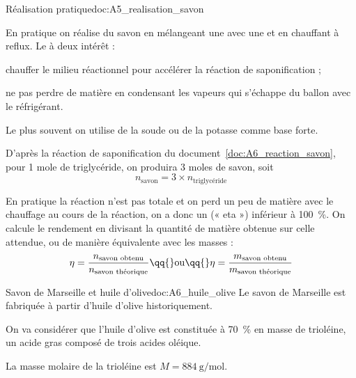 \begin{doc}{Réalisation pratique}{doc:A5_realisation_savon}
  \begin{wrapfigure}{r}{0.4\linewidth}
    \centering
    \vspace*{-32pt}
  \end{wrapfigure}
  En pratique on réalise du savon en mélangeant une  avec une  et en chauffant à reflux.
  Le  à deux intérêt :
  \begin{listePoints}
    \item chauffer le milieu réactionnel pour accélérer la réaction de saponification ;
    \item ne pas perdre de matière en condensant les vapeurs qui s'échappe du ballon avec le réfrigérant.
  \end{listePoints}

  Le plus souvent on utilise de la soude  ou de la potasse  comme base forte.

  D'après la réaction de saponification du document~\ref{doc:A6_reaction_savon}, pour 1 mole de triglycéride, on produira 3 moles de savon, soit
  \begin{equation*}
    n_\text{savon} = 3\times n_\text{triglycéride}
  \end{equation*}

  En pratique la réaction n'est pas totale et on perd un peu de matière avec le chauffage au cours de la réaction, on a donc un  (« eta »)  inférieur à \qty{100}{\percent}.
  On calcule le rendement en divisant la quantité de matière obtenue sur celle attendue, ou de manière équivalente avec les masses :
  \begin{equation*}
    \eta = \dfrac{n_\text{savon obtenu}}{n_\text{savon théorique}}
    \qq{} \text{ou} \qq{}
    \eta = \dfrac{m_\text{savon obtenu}}{m_\text{savon théorique}}
  \end{equation*}
\end{doc}

\begin{doc}{Savon de Marseille et huile d'olive}{doc:A6_huile_olive}
  Le savon de Marseille est fabriquée à partir d'huile d'olive historiquement.
  
  On va considérer que l'huile d'olive est constituée à \qty{70}{\percent} en masse de trioléine, un acide gras composé de trois acides oléique.

  La masse molaire de la trioléine est $M = \qty{884}{\g\per\mole}$.
\end{doc}

